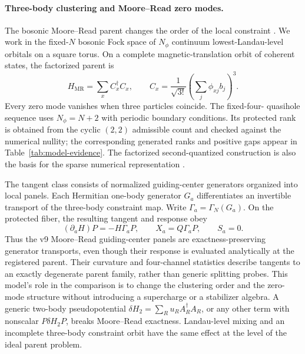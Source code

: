 \paragraph*{Three-body clustering and Moore--Read zero modes.}
The bosonic Moore--Read parent changes the order of the local constraint
\cite{mooreread1991}.  We work in the fixed-$N$ bosonic Fock space of
$N_\phi$ continuum lowest-Landau-level orbitals on a square torus.  On a
complete magnetic-translation orbit of coherent states, the factorized parent
is
\begin{equation}
 H_{\mathrm{MR}}=\sum_x C_x^\dagger C_x,
 \qquad
 C_x=\frac{1}{\sqrt{3!}}\left(\sum_j\phi_{xj}b_j\right)^3.
 \label{eq:moore-read-parent}
\end{equation}
Every zero mode vanishes when three particles coincide.  The fixed-four-
quasihole sequence uses $N_\phi=N+2$ with periodic boundary conditions.  Its
protected rank is obtained from the cyclic $(2,2)$ admissible count and
checked against the numerical nullity; the corresponding generated ranks and
positive gaps appear in Table~\ref{tab:model-evidence}.  The factorized
second-quantized construction is also the basis for the sparse numerical
representation \cite{zhang2023parent}.

The tangent class consists of normalized guiding-center generators organized
into local panels.  Each Hermitian one-body generator $G_a$ differentiates an
invertible transport of the three-body constraint map.  Write
$\Gamma_a=\Gamma_N(G_a)$.  On the protected fiber, the resulting tangent and
response obey
\begin{equation}
 (\partial_aH)P=-H\Gamma_aP,
 \qquad
 X_a=Q\Gamma_aP,
 \qquad S_a=0.
 \label{eq:moore-read-transport}
\end{equation}
Thus the v9 Moore--Read guiding-center panels are exactness-preserving
generator transports, even though their response is evaluated analytically
at the registered parent.  Their curvature and four-channel statistics
describe tangents to an exactly degenerate parent family, rather than generic
splitting probes.  This model's role in the comparison is to change the
clustering order and the zero-mode structure without introducing a
supercharge or a stabilizer algebra.  A generic two-body pseudopotential
$\delta H_2=\sum_R u_R A_R^\dagger A_R$, or any other term with nonscalar
$P\delta H_2P$, breaks Moore--Read exactness.  Landau-level mixing and an
incomplete three-body constraint orbit have the same effect at the level of
the ideal parent problem.

